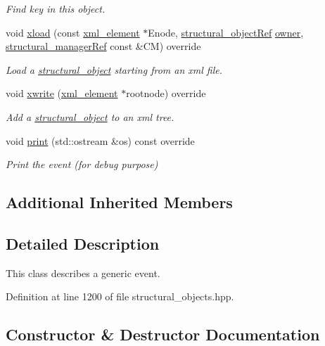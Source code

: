 \begin{DoxyCompactItemize}
\begin{DoxyCompactList}\small\item\em Find key in this object. \end{DoxyCompactList}\item 
void \hyperlink{classevent__o_a933783be16a9351aae3ca84867f950b5}{xload} (const \hyperlink{classxml__element}{xml\+\_\+element} $\ast$Enode, \hyperlink{structural__objects_8hpp_a8ea5f8cc50ab8f4c31e2751074ff60b2}{structural\+\_\+object\+Ref} \hyperlink{classstructural__object_a3e96b3e00b8a78adfc44872d82e186ea}{owner}, \hyperlink{structural__manager_8hpp_ab3136f0e785d8535f8d252a7b53db5b5}{structural\+\_\+manager\+Ref} const \&CM) override
\begin{DoxyCompactList}\small\item\em Load a \hyperlink{classstructural__object}{structural\+\_\+object} starting from an xml file. \end{DoxyCompactList}\item 
void \hyperlink{classevent__o_a53240cc7c1bee201e995d027908afec9}{xwrite} (\hyperlink{classxml__element}{xml\+\_\+element} $\ast$rootnode) override
\begin{DoxyCompactList}\small\item\em Add a \hyperlink{classstructural__object}{structural\+\_\+object} to an xml tree. \end{DoxyCompactList}\item 
void \hyperlink{classevent__o_a013667eb14fd646a89ea8c5ce1c5cd13}{print} (std\+::ostream \&os) const override
\begin{DoxyCompactList}\small\item\em Print the event (for debug purpose) \end{DoxyCompactList}\end{DoxyCompactItemize}
\subsection*{Additional Inherited Members}


\subsection{Detailed Description}
This class describes a generic event. 

Definition at line 1200 of file structural\+\_\+objects.\+hpp.



\subsection{Constructor \& Destructor Documentation}
\mbox{\label{classevent__o_a1c84057bbc0bd928bc9245e9cb7fed89}} 
